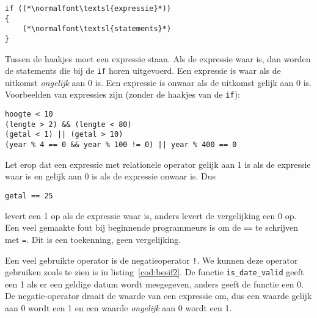 \begin{lstlisting}[caption=Algemene opzet van het \texttt{if}-statement.,label=cod:besif1]
if ((*\normalfont\textsl{expressie}*))
{
    (*\normalfont\textsl{statements}*)
}
\end{lstlisting}

Tussen de haakjes moet een expressie staan. Als de expressie waar is, dan worden de statements die bij de \texttt{if} horen uitgevoerd. Een expressie is waar als de uitkomst \textsl{ongelijk} aan 0 is. Een expressie is onwaar als de uitkomst gelijk aan 0 is. Voorbeelden van expressies zijn (zonder de haakjes van de \texttt{if}):


\begin{lstlisting}[style=lstoneline]
hoogte < 10
(lengte > 2) && (lengte < 80)
(getal < 1) || (getal > 10)
(year % 4 == 0 && year % 100 != 0) || year % 400 == 0
\end{lstlisting}

Let erop dat een expressie met relationele operator gelijk aan 1 is als de expressie waar is en gelijk aan 0 is als de expressie onwaar is. Dus

\hspace*{1em}\texttt{getal == 25}

levert een 1 op als de expressie waar is, anders levert de vergelijking een 0 op. Een veel gemaakte fout bij beginnende programmeurs is om de \texttt{==} te schrijven met \texttt{=}. Dit is een toekenning, geen vergelijking. %

Een veel gebruikte operator is de negatieoperator \texttt{!}. We kunnen deze operator gebruiken zoals te zien is in listing~\ref{cod:besif2}. De functie \texttt{is\_date\_valid} geeft een 1 als er een geldige datum wordt meegegeven, anders geeft de functie een 0. De negatie-operator draait de waarde van een expressie om, dus een waarde gelijk aan 0 wordt een 1 en een waarde \textsl{ongelijk} aan 0 wordt een 1.

